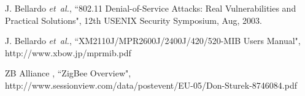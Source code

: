 \documentclass[technicalreport]{ieicej}
\begin{document}
\begin{thebibliography}{99}
J. Bellardo \textit{et~al.},
``802.11 Denial-of-Service Attacks: Real Vulnerabilities and Practical Solutions", 
12th USENIX Security Symposium,
Aug, 2003.

J. Bellardo \textit{et~al.},
``XM2110J/MPR2600J/2400J/420/520-MIB Users Manual", 
http://www.xbow.jp/mprmib.pdf

ZB Alliance ,
``ZigBee Overview", \\
http://www.sessionview.com/data/postevent/EU-05/Don-Sturek-8746084.pdf





\end{thebibliography}
\end{document}
